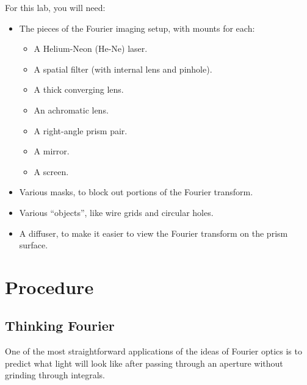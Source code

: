 \documentclass[]{manual}
\begin{document}
    For this lab, you will need:
    \begin{itemize}
        \item The pieces of the Fourier imaging setup, with mounts for each:
        \begin{itemize}
            \item A Helium-Neon (He-Ne) laser.
            \item A spatial filter (with internal lens and pinhole).
            \item A thick converging lens.
            \item An achromatic lens.
            \item A right-angle prism pair.
            \item A mirror.
            \item A screen.
        \end{itemize}
        \item Various masks, to block out portions of the Fourier transform.
        \item Various ``objects'', like wire grids and circular holes.
        \item A diffuser, to make it easier to view the Fourier transform on the prism surface.
    \end{itemize}

    \FloatBarrier
    \newpage

    \section{Procedure}

    \FloatBarrier

    \subsection{Thinking Fourier}
    
    One of the most straightforward applications of the ideas of Fourier optics is to predict what light will look like after passing through an aperture without grinding through integrals.

\end{document}
